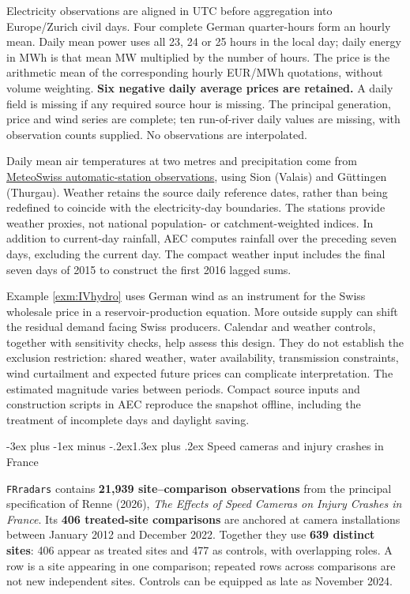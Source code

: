 \documentclass[
  11pt,
]{book}
\makeatletter
\renewcommand\section{\@startsection{section}{1}{\z@}
  {-3ex plus -1ex minus -.2ex}{1.3ex plus .2ex}
  {\normalfont\Large\bfseries\color{TextbookInk}}}
\theoremstyle{definition}
\theoremstyle{definition}
\theoremstyle{definition}
\theoremstyle{definition}
\theoremstyle{remark}
\makeatother
\begin{document}
Electricity observations are aligned in UTC before aggregation into Europe/Zurich civil days. Four complete German quarter-hours form an hourly mean. Daily mean power uses all 23, 24 or 25 hours in the local day; daily energy in MWh is that mean MW multiplied by the number of hours. The price is the arithmetic mean of the corresponding hourly EUR/MWh quotations, without volume weighting. \textbf{Six negative daily average prices are retained.} A daily field is missing if any required source hour is missing. The principal generation, price and wind series are complete; ten run-of-river daily values are missing, with observation counts supplied. No observations are interpolated.

Daily mean air temperatures at two metres and precipitation come from \href{https://opendatadocs.meteoswiss.ch/a-data-groundbased/a1-automatic-weather-stations}{MeteoSwiss automatic-station observations}, using Sion (Valais) and Güttingen (Thurgau). Weather retains the source daily reference dates, rather than being redefined to coincide with the electricity-day boundaries. The stations provide weather proxies, not national population- or catchment-weighted indices. In addition to current-day rainfall, AEC computes rainfall over the preceding seven days, excluding the current day. The compact weather input includes the final seven days of 2015 to construct the first 2016 lagged sums.

Example \ref{exm:IVhydro} uses German wind as an instrument for the Swiss wholesale price in a reservoir-production equation. More outside supply can shift the residual demand facing Swiss producers. Calendar and weather controls, together with sensitivity checks, help assess this design. They do not establish the exclusion restriction: shared weather, water availability, transmission constraints, wind curtailment and expected future prices can complicate interpretation. The estimated magnitude varies between periods. Compact source inputs and construction scripts in AEC reproduce the snapshot offline, including the treatment of incomplete days and daylight saving.

\section{Speed cameras and injury crashes in France}\label{data-radars}

\texttt{FRradars} contains \textbf{21,939 site--comparison observations} from the principal specification of Renne (2026), \emph{The Effects of Speed Cameras on Injury Crashes in France}. Its \textbf{406 treated-site comparisons} are anchored at camera installations between January 2012 and December 2022. Together they use \textbf{639 distinct sites}: 406 appear as treated sites and 477 as controls, with overlapping roles. A row is a site appearing in one comparison; repeated rows across comparisons are not new independent sites. Controls can be equipped as late as November 2024.
\end{document}
